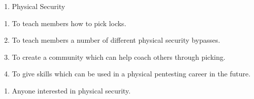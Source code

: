 

\begin{enumerate}
	\item Physical Security
\end{enumerate}


\begin{enumerate}
	\item To teach members how to pick locks.
	\item To teach members a number of different physical security bypasses.
	\item To create a community which can help coach others through picking.
	\item To give skills which can be used in a physical pentesting career in the future.
\end{enumerate}


\begin{enumerate}
	\item Anyone interested in physical security.
\end{enumerate}